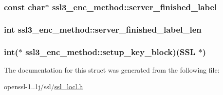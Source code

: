 \hypertarget{structssl3__enc__method_a395147aef41fded62c7690876b1c016a}{
\subsubsection[{server\-\_\-finished\-\_\-label}]{\setlength{\rightskip}{0pt plus 5cm}const char$\ast$ ssl3\-\_\-enc\-\_\-method\-::server\-\_\-finished\-\_\-label}}\label{structssl3__enc__method_a395147aef41fded62c7690876b1c016a}
\hypertarget{structssl3__enc__method_a09dad445d45b7e4ead7dba8eff209f5d}{
\subsubsection[{server\-\_\-finished\-\_\-label\-\_\-len}]{\setlength{\rightskip}{0pt plus 5cm}int ssl3\-\_\-enc\-\_\-method\-::server\-\_\-finished\-\_\-label\-\_\-len}}\label{structssl3__enc__method_a09dad445d45b7e4ead7dba8eff209f5d}
\hypertarget{structssl3__enc__method_a53f84a2dc07948ff4b082a7824080f3f}{
\subsubsection[{setup\-\_\-key\-\_\-block}]{\setlength{\rightskip}{0pt plus 5cm}int($\ast$ ssl3\-\_\-enc\-\_\-method\-::setup\-\_\-key\-\_\-block)(S\-S\-L $\ast$)}}\label{structssl3__enc__method_a53f84a2dc07948ff4b082a7824080f3f}


The documentation for this struct was generated from the following file\-:\begin{DoxyCompactItemize}
\item 
openssl-\/1..\-1j/ssl/\hyperlink{ssl__locl_8h}{ssl\-\_\-locl.\-h}\end{DoxyCompactItemize}
